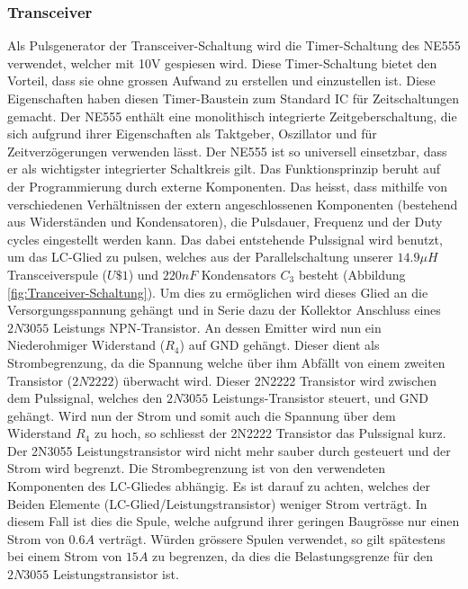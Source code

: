 \subsubsection*{Transceiver}
Als Pulsgenerator der Transceiver-Schaltung wird die Timer-Schaltung des NE555 verwendet, welcher mit 10V gespiesen wird. Diese Timer-Schaltung bietet den Vorteil, dass sie ohne grossen Aufwand zu erstellen und  einzustellen ist. Diese Eigenschaften haben diesen Timer-Baustein zum Standard IC für Zeitschaltungen gemacht. Der NE555 enthält eine monolithisch integrierte Zeitgeberschaltung, die sich aufgrund ihrer Eigenschaften als Taktgeber, Oszillator und für Zeitverzögerungen verwenden lässt. Der NE555 ist so universell einsetzbar, dass er als wichtigster integrierter Schaltkreis gilt. Das Funktionsprinzip beruht auf der Programmierung durch externe Komponenten. Das heisst, dass mithilfe von verschiedenen Verhältnissen der extern angeschlossenen Komponenten (bestehend aus Widerständen und Kondensatoren), die Pulsdauer, Frequenz und der Duty cycles eingestellt werden kann. Das dabei entstehende Pulssignal wird benutzt, um das LC-Glied zu pulsen, welches aus der Parallelschaltung unserer $14.9 \mu H$  Transceiverspule ($U\$1$) und $220 nF$ Kondensators $C_{3}$ besteht (Abbildung \ref{fig:Tranceiver-Schaltung}). Um dies zu ermöglichen wird dieses Glied an die Versorgungsspannung gehängt und in Serie dazu der Kollektor Anschluss eines $2N3055$ Leistungs NPN-Transistor. An dessen Emitter wird nun ein Niederohmiger Widerstand ($R_{4}$) auf GND gehängt. Dieser dient als Strombegrenzung, da die Spannung welche über ihm Abfällt von einem zweiten Transistor ($2N2222$) überwacht wird. Dieser 2N2222 Transistor wird zwischen dem Pulssignal, welches den $2N3055$ Leistungs-Transistor steuert, und GND gehängt. Wird nun der Strom und somit auch die Spannung über dem Widerstand $R_{4}$ zu hoch, so schliesst der 2N2222 Transistor das Pulssignal kurz. Der 2N3055 Leistungstransistor wird nicht mehr sauber durch gesteuert und der Strom wird begrenzt. Die Strombegrenzung ist von den verwendeten Komponenten des LC-Gliedes abhängig. Es ist darauf zu achten, welches der Beiden Elemente (LC-Glied/Leistungstransistor) weniger Strom verträgt. In diesem Fall ist dies die Spule, welche aufgrund ihrer geringen Baugrösse nur einen Strom von $0.6A$ verträgt. Würden grössere Spulen verwendet, so gilt spätestens bei einem Strom von $15A$ zu begrenzen, da dies die Belastungsgrenze für den $2N3055$ Leistungstransistor ist.   


